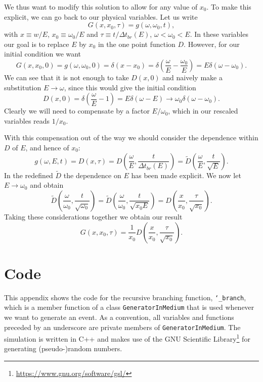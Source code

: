 \documentclass[a4paper,12pt]{article}
\numberwithin{equation}{section}
\begin{document}
We thus want to modify this solution to allow for any value of $x_0$. To make this explicit, we can go back to our physical variables. Let us write
\begin{equation}
G(x,x_0,\tau)=g(\omega, \omega_0,t),
\end{equation}
with $x \equiv w/E$, $x_0 \equiv \omega_0/E$ and $\tau \equiv t/\Delta t_{br}(E)$, $\omega < \omega_0 <E$. In these variables our goal is to replace $E$ by $x_0$ in the one point function $D$. However, for our initial condition we want
\begin{equation}
G(x,x_0,0)=g(\omega,\omega_0,0)=\delta(x-x_0)=\delta \left( \frac{\omega}{E} - \frac{\omega_0}{E}\right)=E\delta(\omega-\omega_0).
\end{equation}
We can see that it is not enough to take $D(x,0)$ and naively make a substitution $E\rightarrow \omega$, since this would give the initial condition
\begin{equation}
D(x,0)=\delta\left(\frac{\omega}{E}-1\right)=E\delta(\omega-E)\rightarrow \omega_0 \delta(\omega-\omega_0).
\end{equation}
Clearly we will need to compensate by a factor $E/\omega_0$, which in our rescaled variables reads $1/x_0$.

With this compensation out of the way we should consider the dependence within $D$ of $E$, and hence of $x_0$:
\begin{equation}
g(\omega,E,t)=D(x,\tau)=D\left( \frac{\omega}{E},\frac{t}{\Delta t_{br}(E)}\right)=\tilde{D} \left( \frac{\omega}{E},\frac{t}{\sqrt{E}}\right).
\end{equation}
In the redefined $\tilde{D}$ the dependence on $E$ has been made explicit. We now let $E\rightarrow \omega_0$ and obtain
\begin{equation}
\tilde{D}\left( \frac{\omega}{\omega_0},\frac{t}{\sqrt{\omega_0}}\right)=\tilde{D}\left( \frac{\omega}{\omega_0},\frac{t}{\sqrt{x_0 E}}\right)=D\left( \frac{x}{x_0},\frac{\tau}{\sqrt{x_0}}\right).
\end{equation}
Taking these considerations together we obtain our result
\begin{equation}
G(x,x_0,\tau) = \frac{1}{x_0} D\left(\frac{x}{x_0},\frac{\tau}{\sqrt{x_0}}\right).
\end{equation}

\newpage
\section{Code}\label{code}
This appendix shows the code for the recursive branching function, {\tt \char`_branch}, which is a member function of a class {\tt GeneratorInMedium} that is used whenever we want to generate an event. As a convention, all variables and functions preceded by an underscore are private members of {\tt GeneratorInMedium}. 
The simulation is written in C++ and makes use of the GNU Scientific Library\footnote{\url{https://www.gnu.org/software/gsl/}} for generating (pseudo-)random numbers.
\end{document}
